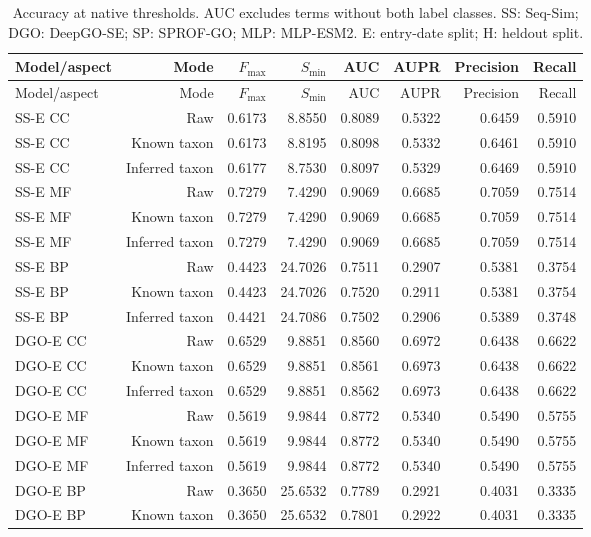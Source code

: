 \begingroup\scriptsize
\setlength{\tabcolsep}{4pt}
\begin{longtable}{lrrrrrrr}
\caption{Accuracy at native thresholds. AUC excludes terms without both label classes. SS: Seq-Sim; DGO: DeepGO-SE; SP: SPROF-GO; MLP: MLP-ESM2. E: entry-date split; H: heldout split.}\label{tab:supp-accuracy}\\
\toprule
Model/aspect & Mode & $F_{\max}$ & $S_{\min}$ & AUC & AUPR & Precision & Recall \\
\midrule
\endfirsthead
\toprule
Model/aspect & Mode & $F_{\max}$ & $S_{\min}$ & AUC & AUPR & Precision & Recall \\
\midrule
\endhead
SS-E CC & Raw & 0.6173 & 8.8550 & 0.8089 & 0.5322 & 0.6459 & 0.5910 \\
SS-E CC & Known taxon & 0.6173 & 8.8195 & 0.8098 & 0.5332 & 0.6461 & 0.5910 \\
SS-E CC & Inferred taxon & 0.6177 & 8.7530 & 0.8097 & 0.5329 & 0.6469 & 0.5910 \\
SS-E MF & Raw & 0.7279 & 7.4290 & 0.9069 & 0.6685 & 0.7059 & 0.7514 \\
SS-E MF & Known taxon & 0.7279 & 7.4290 & 0.9069 & 0.6685 & 0.7059 & 0.7514 \\
SS-E MF & Inferred taxon & 0.7279 & 7.4290 & 0.9069 & 0.6685 & 0.7059 & 0.7514 \\
SS-E BP & Raw & 0.4423 & 24.7026 & 0.7511 & 0.2907 & 0.5381 & 0.3754 \\
SS-E BP & Known taxon & 0.4423 & 24.7026 & 0.7520 & 0.2911 & 0.5381 & 0.3754 \\
SS-E BP & Inferred taxon & 0.4421 & 24.7086 & 0.7502 & 0.2906 & 0.5389 & 0.3748 \\
DGO-E CC & Raw & 0.6529 & 9.8851 & 0.8560 & 0.6972 & 0.6438 & 0.6622 \\
DGO-E CC & Known taxon & 0.6529 & 9.8851 & 0.8561 & 0.6973 & 0.6438 & 0.6622 \\
DGO-E CC & Inferred taxon & 0.6529 & 9.8851 & 0.8562 & 0.6973 & 0.6438 & 0.6622 \\
DGO-E MF & Raw & 0.5619 & 9.9844 & 0.8772 & 0.5340 & 0.5490 & 0.5755 \\
DGO-E MF & Known taxon & 0.5619 & 9.9844 & 0.8772 & 0.5340 & 0.5490 & 0.5755 \\
DGO-E MF & Inferred taxon & 0.5619 & 9.9844 & 0.8772 & 0.5340 & 0.5490 & 0.5755 \\
DGO-E BP & Raw & 0.3650 & 25.6532 & 0.7789 & 0.2921 & 0.4031 & 0.3335 \\
DGO-E BP & Known taxon & 0.3650 & 25.6532 & 0.7801 & 0.2922 & 0.4031 & 0.3335 \\

\end{longtable}

